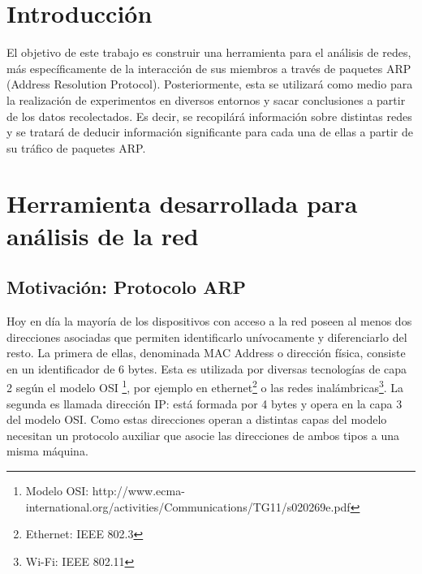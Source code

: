 
\lstset{escapechar=@,style=customc}




\fecha{\today}

\grupo{}


\maketitle

\tableofcontents
\newpage

\section{Introducción}
El objetivo de este trabajo es construir una herramienta para el análisis de redes, más específicamente de la interacción de sus miembros a través de paquetes ARP (Address Resolution Protocol). Posteriormente, esta se utilizará como medio para la realización de experimentos en diversos entornos y sacar conclusiones a partir de los datos recolectados. Es decir, se recopilárá información sobre distintas redes y se tratará de deducir información significante para cada una de ellas a partir de su tráfico de paquetes ARP.

\section{Herramienta desarrollada para análisis de la red}
\subsection{Motivaci\'on: Protocolo ARP}
Hoy en día la mayoría de los dispositivos con acceso a la red poseen al menos dos direcciones asociadas que permiten identificarlo unívocamente y diferenciarlo del resto. La primera de ellas, denominada MAC Address o dirección física, consiste en un identificador de 6 bytes. Esta es utilizada por diversas tecnologías de capa 2 según el modelo OSI \footnote{Modelo OSI: http://www.ecma-international.org/activities/Communications/TG11/s020269e.pdf}, por ejemplo en ethernet\footnote{Ethernet: IEEE 802.3} o las redes inalámbricas\footnote{Wi-Fi: IEEE 802.11}. La segunda es llamada dirección IP: está formada por 4 bytes y opera en la capa 3 del modelo OSI. Como estas direcciones operan a distintas capas del modelo necesitan un protocolo auxiliar que asocie las direcciones de ambos tipos a una misma máquina.

